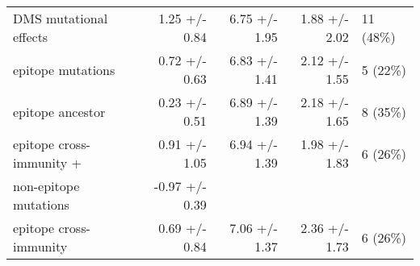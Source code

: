 \begin{tabular*}{1.0\textwidth}{lrrrl}
            DMS mutational effects &   1.25 +/- 0.84 &                          6.75 +/- 1.95 &                                   1.88 +/- 2.02 &                               11 (48\%) \\
                 epitope mutations &   0.72 +/- 0.63 &                          6.83 +/- 1.41 &                                   2.12 +/- 1.55 &                                5 (22\%) \\
                  epitope ancestor &   0.23 +/- 0.51 &                          6.89 +/- 1.39 &                                   2.18 +/- 1.65 &                                8 (35\%) \\
          epitope cross-immunity + &   0.91 +/- 1.05 &                          6.94 +/- 1.39 &                                   1.98 +/- 1.83 &                                6 (26\%) \\
 \hspace{3mm}non-epitope mutations &  -0.97 +/- 0.39 &                                        &                                                 &                                         \\
            epitope cross-immunity &   0.69 +/- 0.84 &                          7.06 +/- 1.37 &                                   2.36 +/- 1.73 &                                6 (26\%) \\
\bottomrule
\end{tabular*}
